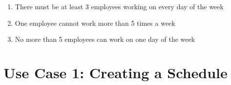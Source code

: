 \documentclass[12pt]{article}
\begin{document}
\begin{enumerate}

\item
There must be at least 3 employees working on every day of the week

\item
One employee cannot work more than 5 times a week

\item
No more than 5 employees can work on one day of the week

\end{enumerate}

\section*{ Use Case 1: Creating a Schedule}
\end{document}
